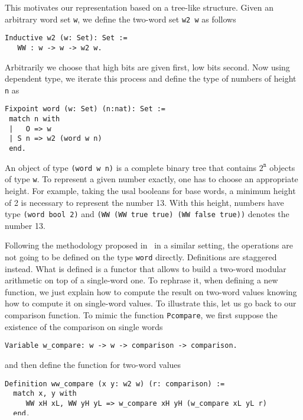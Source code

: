 This motivates our representation based on a tree-like structure. Given an arbitrary word set {\tt w}, we define
the two-word set {\tt w2 w} as follows 
\begin{verbatim}
Inductive w2 (w: Set): Set :=  
   WW : w -> w -> w2 w.
\end{verbatim}
Arbitrarily we choose that high bits are given first, low bits
second. Now using dependent type, we iterate this process and define
the type of numbers of height {\tt n} as
\begin{verbatim}
Fixpoint word (w: Set) (n:nat): Set :=
 match n with
 |   O => w
 | S n => w2 (word w n)
 end.
\end{verbatim}
An object of type {\tt (word w n)} is a complete binary tree that
contains $2^\texttt{n}$ objects of type {\tt w}.
To represent a given number exactly, one has to choose an appropriate height.
For example, taking the usal booleans for base words, a minimum
height of 2 is necessary to represent the number 13. With this height, 
numbers have type {\tt (word bool 2)} and 
{\tt (WW (WW true true) (WW false true))} denotes the number 13.

Following the methodology proposed in~\cite{GreMa} in a similar setting, 
the operations are not going to be defined on the type {\tt word} directly.
Definitions are staggered instead. What is defined is a functor that 
allows to build a two-word modular arithmetic on top of a single-word one. To rephrase it,
when defining a new function, we just explain how to compute the 
result on two-word values knowing how to compute it on single-word values.
To illustrate this, let us go back to our comparison function. 
To mimic the function {\tt Pcompare}, we first suppose the existence
of the comparison on single words
\begin{verbatim}
Variable w_compare: w -> w -> comparison -> comparison.
\end{verbatim}
and then define the function for two-word values
\begin{verbatim}
Definition ww_compare (x y: w2 w) (r: comparison) :=
  match x, y with
     WW xH xL, WW yH yL => w_compare xH yH (w_compare xL yL r) 
  end.
\end{verbatim}
This is not the function that is in our library. We can take 
advantage of the tree-like structure and compare high bits first.  
\begin{verbatim}
Variable w_cmp: w -> w -> comparison.left

Definition ww_cmp (x y: w2 w) :=
  match x, y with
     WW xH xL, WW yH yL => 
       match w_cmp xH yH with 
          Eq  => w_cmp xL yL
       |  cmp => cmp
       end
  end. 
\end{verbatim}
The capacity of choosing between high and low bits alone is
not sufficient to justify our choice of representation. What
is important with this representation is that we get for free
the possibility to split numbers in two. The next section 
explains why this property is crucial to implement efficient
algorithms for functions like multiplication, division and square root.
Note that in term of memory allocation, having a tree structure
does not produce any overhead. Building a tree structure or 
building the equivalent linear list of words require the same number of cells.

